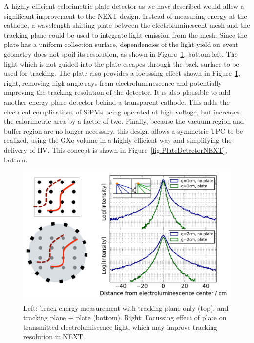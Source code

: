 A highly efficient calorimetric plate detector as we have described would allow a significant improvement to the NEXT design.  Instead of measuring energy at the cathode, a wavelength-shifting plate between the electroluminescent mesh and the tracking plane could be used to integrate light emission from the mesh. Since the plate has a uniform collection surface,  dependencies of the light yield on event geometry does not spoil its resolution, as shown in Figure~\ref{fig:TrackingEffect}, bottom left.  The light which is not guided into the plate escapes through the back surface to be used for tracking.  The plate also provides a focussing effect shown in Figure~\ref{fig:TrackingEffect}, right, removing high-angle rays from electroluminescence and potentially improving the tracking resolution of the detector.  It is also plausible to add another energy plane detector behind a transparent cathode. This adds the electrical complications of  SiPMs being operated at high voltage, but increases the calorimetric area by a factor of two.  Finally, because the vacuum region and buffer region are no longer necessary, this design allows a symmetric TPC to be realized, using the GXe volume in a highly efficient way and simplifying the delivery of HV.  This concept is shown in Figure~\ref{fig:PlateDetectorNEXT}, bottom.




\begin{figure}[t!]
\begin{centering}

\includegraphics[width=0.85\columnwidth]{./images/FocussingEffectAndTrackShape.pdf}
\par\end{centering}

\caption{Left: Track energy measurement with tracking plane only (top), and tracking plane + plate (bottom).  Right: Focussing effect of plate on transmitted electrolumiscence light, which may improve tracking resolution in NEXT. \label{fig:TrackingEffect}}

\end{figure}

